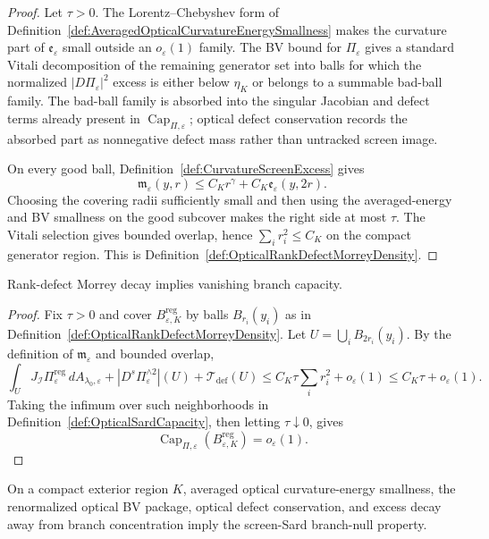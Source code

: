 \begin{proof}
Let $\tau>0$. The Lorentz--Chebyshev form of Definition~\ref{def:AveragedOpticalCurvatureEnergySmallness} makes the curvature part of $\mathfrak e_\varepsilon$ small outside an $o_\varepsilon(1)$ family. The BV bound for $\Pi_\varepsilon$ gives a standard Vitali decomposition of the remaining generator set into balls for which the normalized $|D\Pi_\varepsilon|^2$ excess is either below $\eta_K$ or belongs to a summable bad-ball family. The bad-ball family is absorbed into the singular Jacobian and defect terms already present in $\operatorname{Cap}_{\Pi,\varepsilon}$; optical defect conservation records the absorbed part as nonnegative defect mass rather than untracked screen image.

On every good ball, Definition~\ref{def:CurvatureScreenExcess} gives
\[
    \mathfrak m_\varepsilon(y,r)
    \le C_K r^\gamma+C_K\mathfrak e_\varepsilon(y,2r).
\]
Choosing the covering radii sufficiently small and then using the averaged-energy and BV smallness on the good subcover makes the right side at most $\tau$. The Vitali selection gives bounded overlap, hence $\sum_i r_i^2\le C_K$ on the compact generator region. This is Definition~\ref{def:OpticalRankDefectMorreyDensity}.
\end{proof}

\begin{lemma}\label{lem:RankDefectMorreyVanishingCapacity}
Rank-defect Morrey decay implies vanishing branch capacity.
\end{lemma}

\begin{proof}
Fix $\tau>0$ and cover $B_{\varepsilon,K}^{\mathrm{reg}}$ by balls $B_{r_i}(y_i)$ as in Definition~\ref{def:OpticalRankDefectMorreyDensity}. Let $U=\bigcup_i B_{2r_i}(y_i)$. By the definition of $\mathfrak m_\varepsilon$ and bounded overlap,
\[
    \int_U J_{\mathscr I}\Pi_{\varepsilon}^{\mathrm{reg}}\,dA_{\lambda_0,\varepsilon}
    +
    |D^s\Pi_{\varepsilon}^{\wedge 2}|(U)
    +
    \mathcal T_{\mathrm{def}}(U)
    \le
    C_K\tau\sum_i r_i^2
    +
    o_\varepsilon(1)
    \le
    C_K\tau+o_\varepsilon(1).
\]
Taking the infimum over such neighborhoods in Definition~\ref{def:OpticalSardCapacity}, then letting $\tau\downarrow0$, gives
\[
    \operatorname{Cap}_{\Pi,\varepsilon}
    (B_{\varepsilon,K}^{\mathrm{reg}})
    =
    o_\varepsilon(1).
\]
\end{proof}

\begin{theorem}\label{thm:MorreyCapacityBranchNull}
On a compact exterior region $K$, averaged optical curvature-energy smallness, the renormalized optical BV package, optical defect conservation, and excess decay away from branch concentration imply the screen-Sard branch-null property.
\end{theorem}

